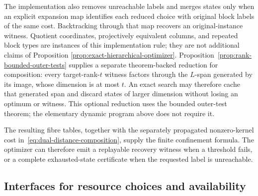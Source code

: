 The implementation also removes unreachable labels and merges states only
when an explicit expansion map identifies each reduced choice with original
block labels of the same cost.  Backtracking through that map recovers an
original-instance witness.  Quotient coordinates, projectively equivalent
columns, and repeated block types are instances of this implementation rule;
they are not additional claims of Proposition
\ref{prop:exact-hierarchical-optimizer}.
Proposition~\ref{prop:rank-bounded-outer-tests} supplies a separate
theorem-backed reduction for composition: every target-rank-$t$ witness
factors through the $L$-span generated by its image, whose dimension is at
most $t$.  An exact search may therefore cache that generated span and discard
states of larger dimension without losing an optimum or witness.  This
optional reduction uses the bounded outer-test theorem; the elementary
dynamic program above does not require it.

The resulting fibre tables, together with the separately propagated
nonzero-kernel cost in~\eqref{eq:dual-distance-composition}, supply the
finite confinement formula.
The optimizer can therefore emit a replayable recovery witness when a threshold fails,
or a complete exhausted-state certificate when the requested label is
unreachable.

\subsection{Interfaces for resource choices and availability}

